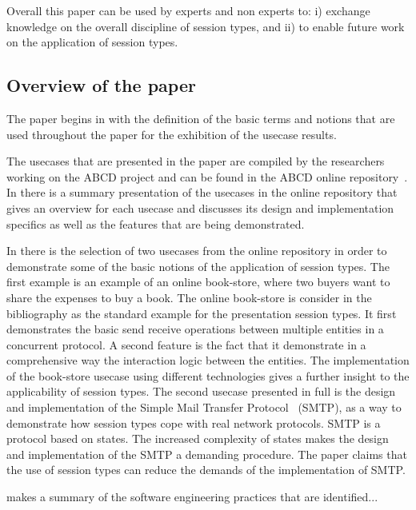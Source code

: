 Overall this paper can be used by experts and non experts
to: i) exchange knowledge on the overall discipline of session types,
and ii) to enable future work on the application of session types.


\subsection{Overview of the paper}

The paper begins in 
with the definition of the basic terms and notions
that are used throughout the paper for the exhibition of the usecase
results.

The usecases that are presented in the paper are compiled by the researchers
working on the ABCD project and can be found in the ABCD online repository~\cite{usecase_repository}.
In  there is a summary presentation
of the usecases in the online repository that gives an overview
for each usecase and discusses its design and implementation specifics
as well as the features that are being demonstrated.

In  there is the selection of two
usecases from the online repository in order to demonstrate
some of the basic notions of the application of session types.
The first example is an example of an online book-store,
where two buyers want to share the expenses to buy a book.
The online book-store is consider in the bibliography as the
standard example for the presentation session types.
It first demonstrates the basic send receive operations
between multiple entities in a concurrent protocol. A second
feature is the fact that it demonstrate in a comprehensive
way the interaction logic between the entities.
The implementation of the book-store usecase using different
technologies gives a further insight to the applicability of
session types.
The second usecase presented in full is the design and implementation
of the Simple Mail Transfer Protocol~\cite{citation_needed} (SMTP),
as a way to demonstrate how session types cope with real network
protocols. SMTP is a protocol based on states. The increased complexity
of states makes the design and implementation of the SMTP a demanding
procedure. The paper claims that the use of session types can reduce
the demands of the implementation of SMTP.

 makes a summary of the software engineering
practices that are identified... 



